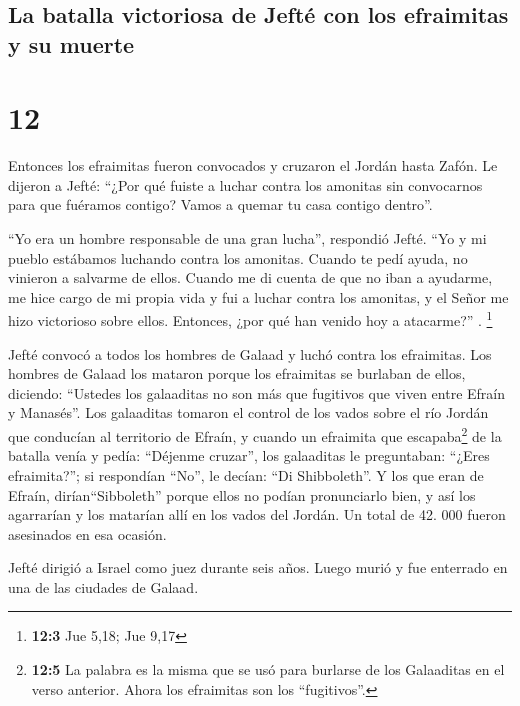 \hypertarget{la-batalla-victoriosa-de-jeftuxe9-con-los-efraimitas-y-su-muerte}{%
\subsection{La batalla victoriosa de Jefté con los efraimitas y su
muerte}\label{la-batalla-victoriosa-de-jeftuxe9-con-los-efraimitas-y-su-muerte}}

\hypertarget{section-11}{%
\section{12}\label{section-11}}

 Entonces los efraimitas fueron convocados y cruzaron el
Jordán hasta Zafón. Le dijeron a Jefté: ``¿Por qué fuiste a luchar
contra los amonitas sin convocarnos para que fuéramos contigo? Vamos a
quemar tu casa contigo dentro''.

 ``Yo era un hombre responsable de una gran lucha'',
respondió Jefté. ``Yo y mi pueblo estábamos luchando contra los
amonitas. Cuando te pedí ayuda, no vinieron a salvarme de ellos.
 Cuando me di cuenta de que no iban a ayudarme, me hice
cargo de mi propia vida y fui a luchar contra los amonitas, y el Señor
me hizo victorioso sobre ellos. Entonces, ¿por qué han venido hoy a
atacarme?'' . \footnote{\textbf{12:3} Jue 5,18; Jue 9,17}

 Jefté convocó a todos los hombres de Galaad y luchó
contra los efraimitas. Los hombres de Galaad los mataron porque los
efraimitas se burlaban de ellos, diciendo: ``Ustedes los galaaditas no
son más que fugitivos que viven entre Efraín y Manasés''. 
Los galaaditas tomaron el control de los vados sobre el río Jordán que
conducían al territorio de Efraín, y cuando un efraimita que
escapaba\footnote{\textbf{12:5} La palabra es la misma que se usó para
  burlarse de los Galaaditas en el verso anterior. Ahora los efraimitas
  son los ``fugitivos''.} de la batalla venía y pedía: ``Déjenme
cruzar'', los galaaditas le preguntaban: ``¿Eres efraimita?''; si
respondían ``No'',  le decían: ``Di Shibboleth''. Y los
que eran de Efraín, dirían``Sibboleth'' porque ellos no podían
pronunciarlo bien, y así los agarrarían y los matarían allí en los vados
del Jordán. Un total de 42. 000 fueron asesinados en esa ocasión.

 Jefté dirigió a Israel como juez durante seis años. Luego
murió y fue enterrado en una de las ciudades de Galaad.

